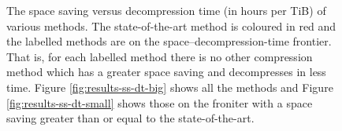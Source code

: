 \begin{figure}
\centering
%
\caption{\label{fig:results-ss-dt}The space saving versus decompression time (in
	hours per TiB) of various methods. The state-of-the-art method is
	coloured in red and the labelled methods are on the
	space--decompression-time frontier. That is, for each labelled method there is no other
	compression method which has a greater space saving and decompresses in
	less time. Figure \ref{fig:results-ss-dt-big} shows all the
	methods and Figure \ref{fig:results-ss-dt-small} shows those on the
	froniter with a space saving greater than or equal to the
	state-of-the-art.}
\end{figure}
